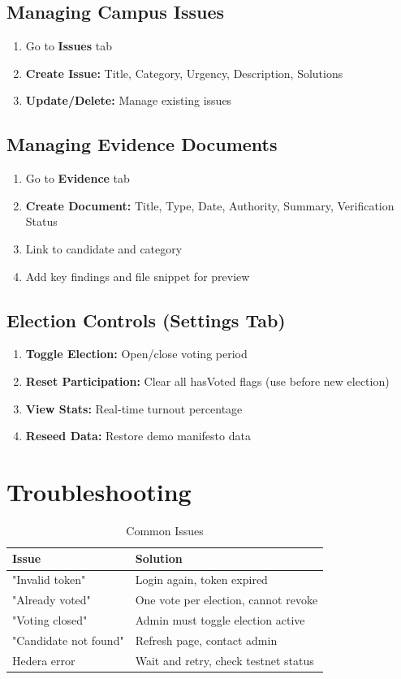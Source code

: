 \subsection{Managing Campus Issues}
\begin{enumerate}
    \item Go to \textbf{Issues} tab
    \item \textbf{Create Issue:} Title, Category, Urgency, Description, Solutions
    \item \textbf{Update/Delete:} Manage existing issues
\end{enumerate}

\subsection{Managing Evidence Documents}
\begin{enumerate}
    \item Go to \textbf{Evidence} tab
    \item \textbf{Create Document:} Title, Type, Date, Authority, Summary, Verification Status
    \item Link to candidate and category
    \item Add key findings and file snippet for preview
\end{enumerate}

\subsection{Election Controls (Settings Tab)}
\begin{enumerate}
    \item \textbf{Toggle Election:} Open/close voting period
    \item \textbf{Reset Participation:} Clear all hasVoted flags (use before new election)
    \item \textbf{View Stats:} Real-time turnout percentage
    \item \textbf{Reseed Data:} Restore demo manifesto data
\end{enumerate}

\section{Troubleshooting}
\label{sec:troubleshooting}

\begin{table}[H]
\centering
\caption{Common Issues}
\label{tab:troubleshooting}
\begin{tabular}{@{}ll@{}}
\toprule
\textbf{Issue} & \textbf{Solution} \\
\midrule
"Invalid token" & Login again, token expired \\
"Already voted" & One vote per election, cannot revoke \\
"Voting closed" & Admin must toggle election active \\
"Candidate not found" & Refresh page, contact admin \\
Hedera error & Wait and retry, check testnet status \\
\bottomrule
\end{tabular}
\end{table}